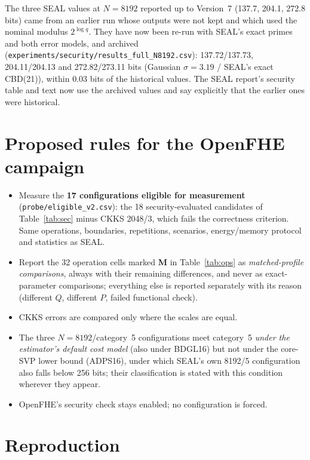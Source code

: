 \documentclass[11pt]{article}
\begin{document}
The three SEAL values at $N{=}8192$ reported up to Version~7 (137.7, 204.1, 272.8 bits) came from an earlier run whose outputs were not kept and which used the nominal modulus $2^{\log q}$. They have now been re-run with SEAL's exact primes and both error models, and archived (\texttt{experiments/security/results\_full\_N8192.csv}): 137.72/137.73, 204.11/204.13 and 272.82/273.11 bits (Gaussian $\sigma{=}3.19$ / SEAL's exact CBD(21)), within 0.03 bits of the historical values. The SEAL report's security table and text now use the archived values and say explicitly that the earlier ones were historical.

\section{Proposed rules for the OpenFHE campaign}

\begin{itemize}[leftmargin=*, itemsep=2pt]
  \item Measure the \textbf{17 configurations eligible for measurement} (\texttt{probe/eligible\_v2.csv}): the 18 security-evaluated candidates of Table~\ref{tab:sec} minus CKKS 2048/3, which fails the correctness criterion. Same operations, boundaries, repetitions, scenarios, energy/memory protocol and statistics as SEAL.
  \item Report the 32 operation cells marked \textbf{M} in Table~\ref{tab:ops} as \emph{matched-profile comparisons}, always with their remaining differences, and never as exact-parameter comparisons; everything else is reported separately with its reason (different $Q$, different $P$, failed functional check).
  \item CKKS errors are compared only where the scales are equal.
  \item The three $N{=}8192$/category~5 configurations meet category~5 \emph{under the estimator's default cost model} (also under BDGL16) but not under the core-SVP lower bound (ADPS16), under which SEAL's own 8192/5 configuration also falls below 256 bits; their classification is stated with this condition wherever they appear.
  \item OpenFHE's security check stays enabled; no configuration is forced.
\end{itemize}

\section{Reproduction}
\label{sec:repro}
\end{document}
